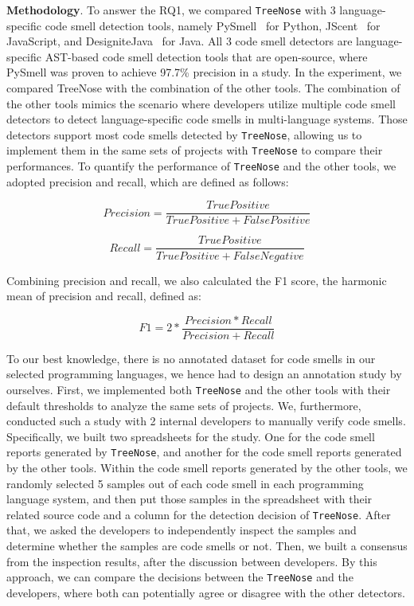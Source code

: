 {\bf Methodology}. To answer the RQ1, we compared \texttt{TreeNose} with 3
language-specific code smell detection tools, namely PySmell~\cite{Pysmell} for
Python, JScent~\cite{Jscent} for JavaScript, and
DesigniteJava~\cite{DesigniteJava} for Java. All 3 code smell detectors are
language-specific AST-based code smell detection tools that are open-source,
where PySmell was proven to achieve 97.7\% precision in a study. In the
experiment, we compared TreeNose with the combination of the other tools. The
combination of the other tools mimics the scenario where developers utilize
multiple code smell detectors to detect language-specific code smells in
multi-language systems. Those detectors support most code smells detected by
\texttt{TreeNose}, allowing us to implement them in the same sets of projects
with \texttt{TreeNose} to compare their performances. To quantify the
performance of \texttt{TreeNose} and the other tools, we adopted precision and
recall, which are defined as follows:

\vspace{-1.25em}

\begin{equation}
    Precision = \frac{True Positive}{True Positive + False Positive}
\end{equation}

\begin{equation}
    Recall = \frac{True Positive}{True Positive + False Negative}
\end{equation}

Combining precision and recall, we also calculated the F1 score, the harmonic
mean of precision and recall, defined as:

\vspace{-0.5em}

\begin{equation}
    F1 = 2 * \frac{Precision * Recall}{Precision + Recall}
\end{equation}

To our best knowledge, there is no annotated dataset for code smells in our
selected programming languages, we hence had to design an annotation study by
ourselves. First, we implemented both \texttt{TreeNose} and the other tools
with their default thresholds to analyze the same sets of projects. We,
furthermore, conducted such a study with 2 internal developers to manually
verify code smells. Specifically, we built two spreadsheets for the study. One
for the code smell reports generated by \texttt{TreeNose}, and another for the
code smell reports generated by the other tools. Within the code smell reports
generated by the other tools, we randomly selected 5 samples out of each code
smell in each programming language system, and then put those samples in the
spreadsheet with their related source code and a column for the detection
decision of \texttt{TreeNose}. After that, we asked the developers to
independently inspect the samples and determine whether the samples are code
smells or not. Then, we built a consensus from the inspection results, after
the discussion between developers. By this approach, we can compare the
decisions between the \texttt{TreeNose} and the developers, where both can
potentially agree or disagree with the other detectors.

